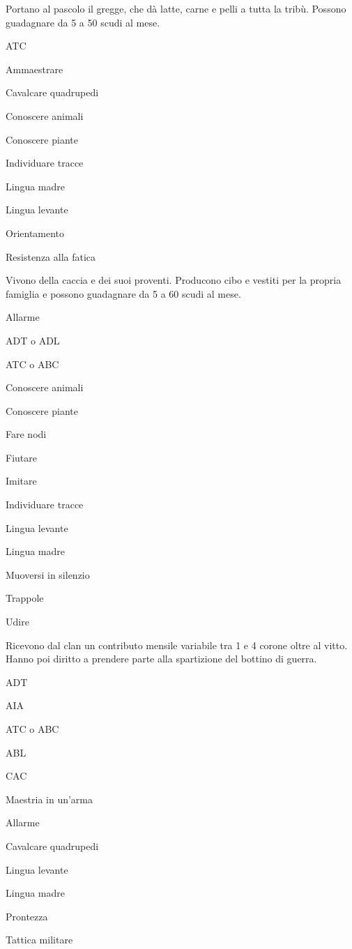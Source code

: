 Portano al pascolo il gregge, che d\`a latte, carne e pelli a tutta la
trib\`u. Possono guadagnare da 5 a 50 scudi al mese.

\begin{abilist}
\item ATC
\item Ammaestrare
\item Cavalcare quadrupedi
\item Conoscere animali
\item Conoscere piante
\item Individuare tracce
\item Lingua madre
\item Lingua levante
\item Orientamento 
\item Resistenza alla fatica
\end{abilist}


Vivono della caccia e dei suoi
proventi. Producono cibo e vestiti per la propria famiglia e possono
guadagnare da 5 a 60 scudi al mese.

\begin{abilist}
\item Allarme
\item ADT o ADL
\item ATC o ABC
\item Conoscere animali
\item Conoscere piante
\item Fare nodi
\item Fiutare
\item Imitare
\item Individuare tracce
\item Lingua levante
\item Lingua madre
\item Muoversi in silenzio
\item Trappole
\item Udire
\end{abilist}


Ricevono dal clan un contributo mensile variabile tra 1 e 4 corone
oltre al vitto. Hanno poi diritto a prendere parte alla spartizione
del bottino di guerra.

\begin{abilist}
\item ADT
\item AIA
\item ATC o ABC
\item ABL
\item CAC
\item Maestria in un'arma
\item Allarme
\item Cavalcare quadrupedi
\item Lingua levante
\item Lingua madre
\item Prontezza
\item Tattica militare
\end{abilist}

